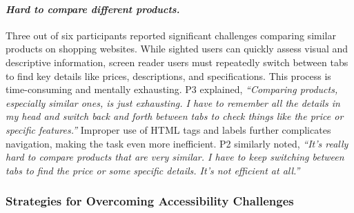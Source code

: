 \paragraph{\textbf{\textit{Hard to compare different products.}}}
Three out of six participants reported significant challenges comparing similar products on shopping websites. While sighted users can quickly assess visual and descriptive information, screen reader users must repeatedly switch between tabs to find key details like prices, descriptions, and specifications. This process is time-consuming and mentally exhausting. P3 explained, \textit{``Comparing products, especially similar ones, is just exhausting. I have to remember all the details in my head and switch back and forth between tabs to check things like the price or specific features.''} Improper use of HTML tags and labels further complicates navigation, making the task even more inefficient. P2 similarly noted, \textit{``It’s really hard to compare products that are very similar. I have to keep switching between tabs to find the price or some specific details. It’s not efficient at all.''}


\subsubsection{Strategies for Overcoming Accessibility Challenges}


